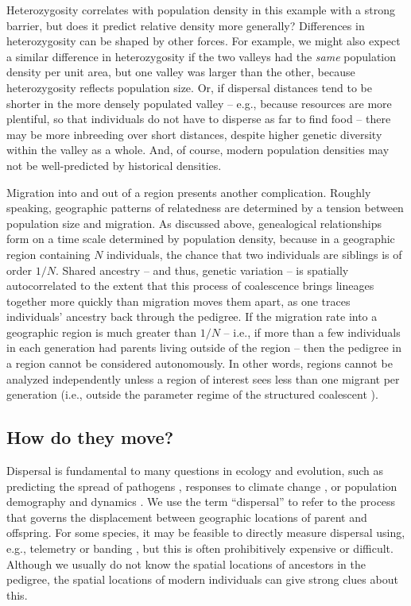 \documentclass{ar-1col}
\renewcommand{\emph}[1]{{\textit{#1}}}
\begin{document}
Heterozygosity correlates with population density in this example with a strong barrier,
but does it predict relative density more generally?
Differences in heterozygosity can be shaped by other forces.
For example, we might also expect a similar difference in heterozygosity
if the two valleys had the \emph{same} population density per unit area,
but one valley was larger than the other,
because heterozygosity reflects population size.
Or, if dispersal distances tend to be shorter
in the more densely populated valley -- 
e.g., because resources are more plentiful, 
so that individuals do not have to disperse as far to find food -- 
there may be more inbreeding over short distances,
despite higher genetic diversity within the valley as a whole.
And, of course, modern population densities may not be well-predicted by historical densities.

Migration into and out of a region presents another complication.
Roughly speaking,
geographic patterns of relatedness
are determined by a tension between population size and migration.
As discussed above,
genealogical relationships form on a time scale determined by population density,
because in a geographic region containing $N$ individuals,
the chance that two individuals are siblings is of order $1/N$.
Shared ancestry -- and thus, genetic variation -- is spatially autocorrelated
to the extent that this process of coalescence
brings lineages together more quickly than migration moves them apart,
as one traces individuals' ancestry back through the pedigree.
If the migration rate into a geographic region is much greater than $1/N$ --
i.e., if more than a few individuals in each generation had parents living outside of the region --
then the pedigree in a region cannot be considered autonomously.
In other words,
regions cannot be analyzed independently
unless a region of interest sees less than one migrant per generation
(i.e., outside the parameter regime of the structured coalescent \citep{nagylaki1998}).


\subsection{How do they move?}

Dispersal is fundamental to many questions in ecology and evolution,
such as
predicting the spread of pathogens \citep{BiekReal2010},
responses to climate change \citep{parmesan2006},
or population demography and dynamics \citep{schreiber2010interactive}.
We use the term ``dispersal'' to refer to the process that governs 
the displacement between geographic locations of parent and offspring.
For some species,
it may be feasible to directly measure dispersal 
using, e.g., telemetry or banding \citep{Cayuela2018demographic},
but this is often prohibitively expensive or difficult.
Although we usually do not know the spatial locations of ancestors in the pedigree,
the spatial locations of modern individuals can give strong clues about this.
\end{document}
